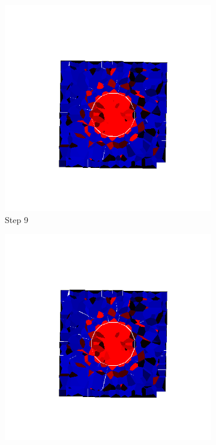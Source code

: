 \begin{figure}[ht!]
      \begin{subfigure}{.25\textwidth}
        \centering
        \includegraphics[width=1.0\linewidth]{Files/Small_ASR/IS/DEP5-STEP(009).png}
      \caption{Step 9}
      \end{subfigure}%
      \begin{subfigure}{.25\textwidth}
        \centering
        \includegraphics[width=1.0\linewidth]{Files/Small_ASR/IS/DEP5-STEP(010).png}

\end{subfigure}
\end{figure}
